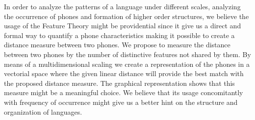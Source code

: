 In order to analyze the patterns of a language under different scales, analyzing
the occurrence of phones and formation of higher order structures, we believe
the usage of the Feature Theory might be providential since it give us a
direct and formal way to quantify a phone characteristics making it possible
to create a distance measure between two phones. We propose to measure the 
distance between two phones by the number of distinctive features not shared 
by them. By means of a multidimensional scaling we create a representation
of the phones in a vectorial space where the given linear distance will
provide the best match with the proposed distance measure. 
The graphical representation shows that this measure might be a meaningful choice.
We believe that its usage concomitantly with frequency of occurrence might
give us a better hint on the structure and organization of languages.




